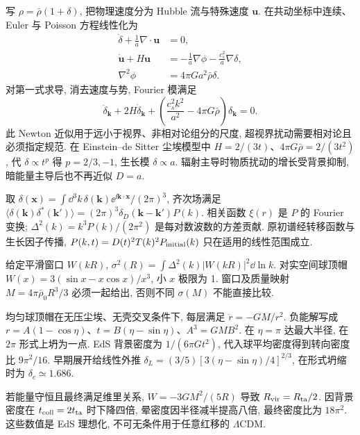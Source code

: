 \label{ch:structure}
写 $\rho=\bar\rho(1+\delta)$, 把物理速度分为 Hubble 流与特殊速度 $\boldsymbol u$. 在共动坐标中连续、Euler 与 Poisson 方程线性化为
\begin{align*}
\dot\delta+\frac1a\nabla\cdot\boldsymbol u&=0,\\
\dot{\boldsymbol u}+H\boldsymbol u&=-\frac1a\nabla\phi-\frac{c_s^2}a\nabla\delta,\\
\nabla^2\phi&=4\pi Ga^2\bar\rho\delta.
\end{align*}
对第一式求导, 消去速度与势, Fourier 模满足
\begin{equation}\label{eq:growth}
\ddot\delta_{\boldsymbol k}+2H\dot\delta_{\boldsymbol k}
+\left(\frac{c_s^2k^2}{a^2}-4\pi G\bar\rho\right)\delta_{\boldsymbol k}=0.
\end{equation}
此 Newton 近似用于远小于视界、非相对论组分的尺度, 超视界扰动需要相对论且必须指定规范. 在 Einstein--de Sitter 尘埃模型中 $H=2/(3t)$、$4\pi G\bar\rho=2/(3t^2)$, 代 $\delta\propto t^p$ 得 $p=2/3,-1$, 生长模 $\delta\propto a$. 辐射主导时物质扰动的增长受背景抑制, 暗能量主导后也不再近似 $D=a$.

取 $\delta(\boldsymbol x)=\int\dd^3k\,\delta(\boldsymbol k)\ee^{\ii\boldsymbol k\cdot\boldsymbol x}/(2\pi)^3$, 齐次场满足 $\langle\delta(\boldsymbol k)\delta^*(\boldsymbol k')\rangle=(2\pi)^3\delta_D(\boldsymbol k-\boldsymbol k')P(k)$. 相关函数 $\xi(r)$ 是 $P$ 的 Fourier 变换; $\Delta^2(k)=k^3P(k)/(2\pi^2)$ 是每对数波数的方差贡献. 原初谱经转移函数与生长因子传播, $P(k,t)=D(t)^2T(k)^2P_{\rm initial}(k)$ 只在适用的线性范围成立.

给定平滑窗口 $W(kR)$, $\sigma^2(R)=\int\Delta^2(k)|W(kR)|^2\dd\ln k$. 对实空间球顶帽 $W(x)=3(\sin x-x\cos x)/x^3$, 小 $x$ 极限为 1. 窗口及质量映射 $M=4\pi\bar\rho_0R^3/3$ 必须一起给出, 否则不同 $\sigma(M)$ 不能直接比较.

均匀球顶帽在无压尘埃、无壳交叉条件下, 每层满足 $\ddot r=-GM/r^2$. 负能解写成 $r=A(1-\cos\eta)$、$t=B(\eta-\sin\eta)$、$A^3=GMB^2$. 在 $\eta=\pi$ 达最大半径, 在 $2\pi$ 形式上坍为一点. EdS 背景密度为 $1/(6\pi Gt^2)$, 代入球平均密度得到转向密度比 $9\pi^2/16$. 早期展开给线性外推 $\delta_L=(3/5)[3(\eta-\sin\eta)/4]^{2/3}$, 在形式坍缩时为 $\delta_c\simeq1.686$.

若能量守恒且最终满足维里关系, $W=-3GM^2/(5R)$ 导致 $R_{\rm vir}=R_{\rm ta}/2$. 因背景密度在 $t_{\rm coll}=2t_{\rm ta}$ 时下降四倍, 晕密度因半径减半提高八倍, 最终密度比为 $18\pi^2$. 这些数值是 EdS 理想化, 不可无条件用于任意红移的 $\Lambda$CDM.

